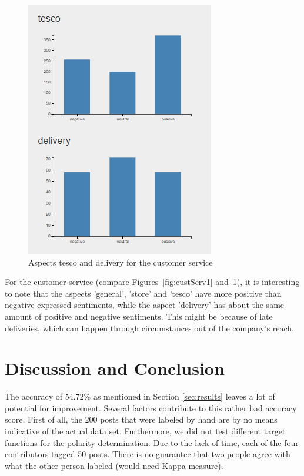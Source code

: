 \documentclass[10pt,a4paper]{article}
\begin{document}
\begin{figure}[!h]
\begin{minipage}[b]{0.48\textwidth}
    \includegraphics[width=\textwidth]{data/custService2}
    \caption{Aspects tesco and delivery for the customer service}
	\label{fig:custServ2}
  \end{minipage}
\end{figure}		
		
		For the customer service (compare Figures~\ref{fig:custServ1} and~\ref{fig:custServ2}), it is interesting to note that the aspects 'general', 'store' and 'tesco' have more positive than negative expressed sentiments, while the aspect 'delivery' has about the same amount of positive and negative sentiments. This might be because of late deliveries, which can happen through circumstances out of the company's reach.
	
	\section{Discussion and Conclusion}
	The accuracy of 54.72\% as mentioned in Section \ref{sec:results} leaves a lot of potential for improvement. Several factors contribute to this rather bad accuracy score. First of all, the 200 posts that were labeled by hand are by no means indicative of the actual data set. Furthermore, we did not test different target functions for the polarity determination. Due to the lack of time, each of the four contributors tagged 50 posts. There is no guarantee that two people agree with what the other person labeled (would need Kappa measure).
\end{document}
